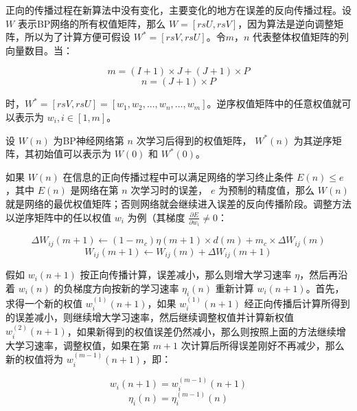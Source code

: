 \documentclass[UTF8]{ctexart}
\begin{document}
正向的传播过程在新算法中没有变化，主要变化的地方在误差的反向传播过程。设 $W$ 表示BP网络的所有权值矩阵，那么 $W = [rsU,rsV]$，因为算法是逆向调整矩阵，所以为了计算方便可假设 $W^* = [rsV,rsU]$。令$m$，$n$ 代表整体权值矩阵的列向量数目。当：

\begin{equation}
m = (I + 1) \times J + (J + 1) \times P
\end{equation}
\begin{equation}
n = (J+1) \times P
\end{equation}

时，$W^* = [rsV,rsU]=[w_1,w_2,...,w_n,...,w_m]$。逆序权值矩阵中的任意权值就可以表示为 $w_i,i \in [1,m]$。 \par

设 $W(n)$ 为BP神经网络第 $n$ 次学习后得到的权值矩阵， $W^*(n)$ 为其逆序矩阵，其初始值可以表示为 $W(0)$ 和 $W^*(0)$。\par

如果 $W(n)$ 在信息的正向传播过程中可以满足网络的学习终止条件 $E(n) \le e$，其中 $E(n)$ 是网络在第 $n$ 次学习时的误差， $e$ 为预制的精度值，那么 $W(n)$ 就是网络的最优权值矩阵；否则网络就会继续进入误差的反向传播阶段。调整方法以逆序矩阵中的任以权值 $w_i$ 为例（其梯度 $\frac{\partial E}{\partial w_i} \ne 0$： \par

\begin{equation}
\Delta W_{ij} (m+1) \gets (1-m_c) \eta(m+1) \times d(m) + m_c \times \Delta W_{ij} (m)
\end{equation}
\begin{equation}
W_{ij} (m+1) \gets W_{ij} (m) + \Delta W_{ij} (m+1)	
\end{equation}

假如 $w_i(n+1)$ 按正向传播计算，误差减小，那么则增大学习速率 $\eta$，然后再沿着 $w_i(n)$ 的负梯度方向按新的学习速率 $\eta_i(n)$ 重新计算 $w_i(n+1)$。首先，求得一个新的权值 $w_i^{(1)}(n+1)$，如果 $w_i^{(1)}(n+1)$ 经正向传播后计算所得到的误差减小，则继续增大学习速率，然后继续调整权值并计算新权值 $w_i^{(2)}(n+1)$，如果新得到的权值误差仍然减小，那么则按照上面的方法继续增大学习速率，调整权值，如果在第 $m+1$ 次计算后所得误差刚好不再减少，那么新的权值将为 $w_i^{(m-1)}(n+1)$，即：

\begin{equation}
w_i(n+1) = w_i^{(m-1)}(n+1)
\end{equation}
\begin{equation}
\eta_i(n) = \eta_i^{(m-1)}(n)	
\end{equation}
\end{document}
